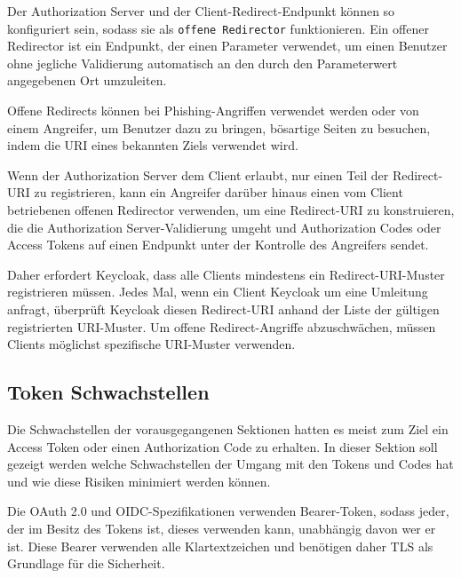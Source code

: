 Der Authorization Server und der Client-Redirect-Endpunkt können so konfiguriert sein, sodass sie als \texttt{offene Redirector} funktionieren. Ein offener Redirector ist ein Endpunkt, der einen Parameter verwendet, um einen Benutzer ohne jegliche Validierung automatisch an den durch den Parameterwert angegebenen Ort umzuleiten. \cite{SSEB_OAuthAuthorizationSecurityConsiderations}

Offene Redirects können bei Phishing-Angriffen verwendet werden oder von einem Angreifer, um Benutzer dazu zu bringen, bösartige Seiten zu besuchen, indem die URI eines bekannten Ziels verwendet wird. \cite{SSEB_OAuthAuthorizationSecurityConsiderations}

Wenn der Authorization Server dem Client erlaubt, nur einen Teil der Redirect-URI zu registrieren, kann ein Angreifer darüber hinaus einen vom Client betriebenen offenen Redirector verwenden, um eine Redirect-URI zu konstruieren, die die Authorization Server-Validierung umgeht und Authorization Codes oder Access Tokens auf einen Endpunkt unter der Kontrolle des Angreifers sendet. \cite{SSEB_OAuthAuthorizationSecurityConsiderations}

Daher erfordert Keycloak, dass alle Clients mindestens ein Redirect-URI-Muster registrieren müssen. Jedes Mal, wenn ein Client Keycloak um eine Umleitung anfragt, überprüft Keycloak diesen Redirect-URI anhand der Liste der gültigen registrierten URI-Muster. Um offene Redirect-Angriffe abzuschwächen, müssen Clients möglichst spezifische URI-Muster verwenden. \cite[Sec. 19]{SSEB_keycloakDocs}

\subsection{Token Schwachstellen}

Die Schwachstellen der vorausgegangenen Sektionen hatten es meist zum Ziel ein Access Token oder einen Authorization Code zu erhalten. In dieser Sektion soll gezeigt werden welche Schwachstellen der Umgang mit den Tokens und Codes hat und wie diese Risiken minimiert werden können. 


Die OAuth 2.0 und OIDC-Spezifikationen verwenden Bearer-Token, sodass jeder, der im Besitz des Tokens ist, dieses verwenden kann, unabhängig davon wer er ist. Diese Bearer verwenden alle Klartextzeichen und benötigen daher TLS als Grundlage für die Sicherheit. \cite{SSEB_OAuthAuthorizationSecurityConsiderations}

